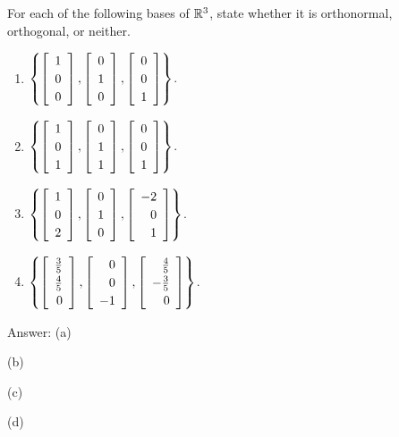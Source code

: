 \documentclass{ximera}
\author{Zack Reed}
\begin{document}
\begin{problem}
  For each of the following bases of $\mathbb{R}^3$, state whether
  it is orthonormal, orthogonal, or neither.
  \begin{enumerate}
  \item $\set{
      \startmat{r} 1 \\ 0 \\ 0 \stopmat,
      \startmat{r} 0 \\ 1 \\ 0 \stopmat,
      \startmat{r} 0 \\ 0 \\ 1 \stopmat
    }$.
  \item $\set{
      \startmat{r} 1 \\ 0 \\ 1 \stopmat,
      \startmat{r} 0 \\ 1 \\ 1 \stopmat,
      \startmat{r} 0 \\ 0 \\ 1 \stopmat
    }$.
  \item $\set{
      \startmat{r}  1 \\ 0 \\ 2 \stopmat,
      \startmat{r}  0 \\ 1 \\ 0 \stopmat,
      \startmat{r} -2 \\ 0 \\ 1 \stopmat
    }$.
  \item $\def\arraystretch{1.2}
    \set{
      \startmat{r} \frac{3}{5} \\ \frac{4}{5} \\ 0 \stopmat,
      \startmat{r} 0 \\ 0 \\ -1 \stopmat,
      \startmat{r} \frac{4}{5} \\ -\frac{3}{5} \\ 0 \stopmat
    }$.
  \end{enumerate}

  Answer:
    (a) \begin{multipleChoice}
    \end{multipleChoice}

  
  (b) \begin{multipleChoice}
  \end{multipleChoice}


(c) \begin{multipleChoice}
\end{multipleChoice}


(d)\begin{multipleChoice}
\end{multipleChoice}
\end{problem}
\end{document}
